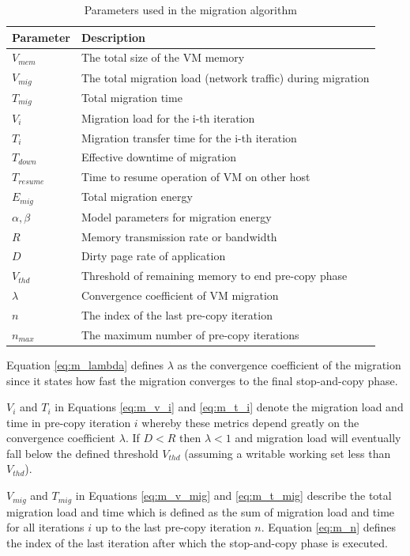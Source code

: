 \begin{table}[htbp]
\centering
\begin{tabular}{ll}
  \hline
	Parameter & Description \\ 
  \hline
		$V_{mem}$ & The total size of the VM memory \\ 
		$V_{mig}$ & The total migration load (network traffic) during migration \\ 
		$T_{mig}$ & Total migration time \\ 
		$V_i$ & Migration load for the i-th iteration \\ 
		$T_i$ & Migration transfer time for the i-th iteration \\ 
		$T_{down}$ & Effective downtime of migration \\ 
		$T_{resume}$ & Time to resume operation of VM on other host \\ 
		$E_{mig}$ & Total migration energy \\ 
		$\alpha, \beta$ & Model parameters for migration energy \\
		$R$ & Memory transmission rate or bandwidth \\ 
		$D$ & Dirty page rate of application \\ 
		$V_{thd}$ & Threshold of remaining memory to end pre-copy phase \\ 
		$\lambda$ & Convergence coefficient of VM migration \\ 
		$n$ & The index of the last pre-copy iteration \\
		$n_{max}$ & The maximum number of pre-copy iterations \\
   \hline
\end{tabular}
\caption{Parameters used in the migration algorithm}
\label{tab:migration_parameters}
\end{table}


Equation \ref{eq:m_lambda} defines $\lambda$ as the convergence coefficient of the migration since it states how fast the migration converges to the final stop-and-copy phase. 

$V_i$ and $T_i$ in Equations \ref{eq:m_v_i} and \ref{eq:m_t_i} denote the migration load and time in pre-copy iteration $i$ whereby these metrics depend greatly on the convergence coefficient $\lambda$. If $D < R$ then $\lambda < 1$ and migration load will eventually fall below the defined threshold $V_{thd}$ (assuming a writable working set less than $V_{thd}$). 

$V_{mig}$ and $T_{mig}$ in Equations \ref{eq:m_v_mig} and \ref{eq:m_t_mig} describe the total migration load and time which is defined as the sum of migration load and time for all iterations $i$ up to the last pre-copy iteration $n$. Equation \ref{eq:m_n} defines the index of the last iteration after which the stop-and-copy phase is executed. 

